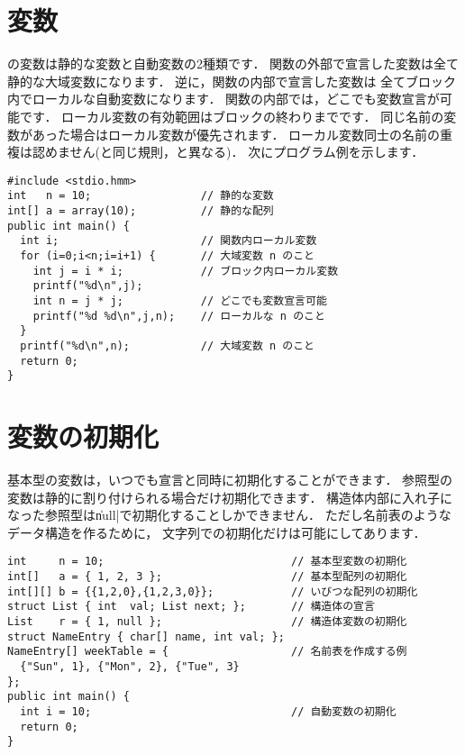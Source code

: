 \section{変数}

\cmml の変数は静的な変数と自動変数の2種類です．
関数の外部で宣言した変数は全て静的な大域変数になります．
逆に，関数の内部で宣言した変数は
全てブロック内でローカルな自動変数になります．
関数の内部では，どこでも変数宣言が可能です．
ローカル変数の有効範囲はブロックの終わりまでです．
同じ名前の変数があった場合はローカル変数が優先されます．
ローカル変数同士の名前の重複は認めません(\javal と同じ規則，\cl と異なる)．
次にプログラム例を示します．

\begin{mylist}
\begin{verbatim}
#include <stdio.hmm>
int   n = 10;                 // 静的な変数
int[] a = array(10);          // 静的な配列
public int main() {
  int i;                      // 関数内ローカル変数
  for (i=0;i<n;i=i+1) {       // 大域変数 n のこと
    int j = i * i;            // ブロック内ローカル変数
    printf("%d\n",j);
    int n = j * j;            // どこでも変数宣言可能
    printf("%d %d\n",j,n);    // ローカルな n のこと
  }                        
  printf("%d\n",n);           // 大域変数 n のこと
  return 0;
}
\end{verbatim}
\end{mylist}

\section{変数の初期化}

基本型の変数は，いつでも宣言と同時に初期化することができます．
参照型の変数は静的に割り付けられる場合だけ初期化できます．
構造体内部に入れ子になった参照型は\|null|で初期化することしかできません．
ただし名前表のようなデータ構造を作るために，
文字列での初期化だけは可能にしてあります．

\begin{mylist}
\begin{verbatim}
int     n = 10;                             // 基本型変数の初期化
int[]   a = { 1, 2, 3 };                    // 基本型配列の初期化
int[][] b = {{1,2,0},{1,2,3,0}};            // いびつな配列の初期化
struct List { int  val; List next; };       // 構造体の宣言
List    r = { 1, null };                    // 構造体変数の初期化
struct NameEntry { char[] name, int val; };
NameEntry[] weekTable = {                   // 名前表を作成する例
  {"Sun", 1}, {"Mon", 2}, {"Tue", 3}
};
public int main() {
  int i = 10;                               // 自動変数の初期化
  return 0;
}
\end{verbatim}
\end{mylist}

